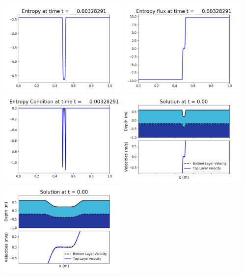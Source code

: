 \documentclass[11pt]{article}
\begin{document}
\vskip 10pt 
\includegraphics[width=0.475\textwidth]{frame0010fig1007.png}
\includegraphics[width=0.475\textwidth]{frame0010fig1008.png}
\vskip 10pt 
\includegraphics[width=0.475\textwidth]{frame0010fig1009.png}
\vskip 10pt 
\includegraphics[width=0.475\textwidth]{frame0011fig1001.png}
\includegraphics[width=0.475\textwidth]{frame0011fig1002.png}
\end{document}

